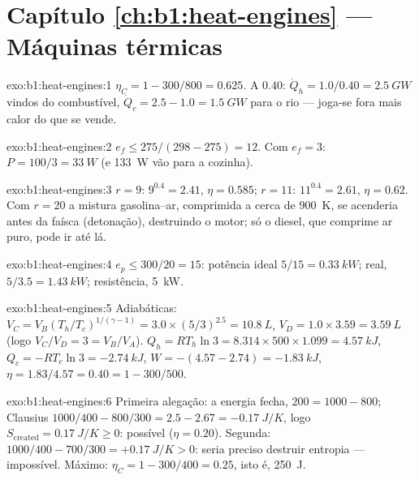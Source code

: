 \section*{Capítulo \ref{ch:b1:heat-engines} --- Máquinas térmicas}

\begin{solution}{exo:b1:heat-engines:1}
$\eta_C = 1 - 300/800 = 0.625$. A $0.40$: $\dot Q_h = 1.0/0.40 = \qty{2.5}{GW}$
vindos do combustível, $\dot Q_c = 2.5 - 1.0 = \qty{1.5}{GW}$ para o rio --- joga-se
fora mais calor do que se vende.
\end{solution}

\begin{solution}{exo:b1:heat-engines:2}
$e_f \leq 275/(298 - 275) = 12$. Com $e_f = 3$: $P = 100/3 = \qty{33}{W}$
(e \qty{133}{W} vão para a cozinha).
\end{solution}

\begin{solution}{exo:b1:heat-engines:3}
$r = 9$: $9^{0.4} = 2.41$, $\eta = 0.585$; $r = 11$: $11^{0.4} = 2.61$,
$\eta = 0.62$. Com $r = 20$ a mistura gasolina--ar, comprimida a cerca de
\qty{900}{K}, se acenderia antes da faísca (detonação), destruindo o
motor; só o diesel, que comprime ar puro, pode ir até lá.
\end{solution}

\begin{solution}{exo:b1:heat-engines:4}
$e_p \leq 300/20 = 15$: potência ideal $5/15 = \qty{0.33}{kW}$; real, $5/3.5 =
\qty{1.43}{kW}$; resistência, \qty{5}{kW}.
\end{solution}

\begin{solution}{exo:b1:heat-engines:5}
Adiabáticas: $V_C = V_B(T_h/T_c)^{1/(\gamma-1)} = 3.0 \times (5/3)^{2.5} =
\qty{10.8}{L}$, $V_D = 1.0 \times 3.59 = \qty{3.59}{L}$ (logo $V_C/V_D = 3 =
V_B/V_A$). $Q_h = RT_h\ln3 = 8.314 \times 500 \times 1.099 = \qty{4.57}{kJ}$,
$Q_c = -RT_c\ln3 = \qty{-2.74}{kJ}$, $W = -(4.57 - 2.74) = \qty{-1.83}{kJ}$,
$\eta = 1.83/4.57 = 0.40 = 1 - 300/500$.
\end{solution}

\begin{solution}{exo:b1:heat-engines:6}
Primeira alegação: a energia fecha, $200 = 1000 - 800$; Clausius $1000/400 - 800/300
= 2.5 - 2.67 = \qty{-0.17}{J/K}$, logo $S_{\mathrm{created}} = \qty{0.17}{J/K} \geq 0$:
possível ($\eta = 0.20$). Segunda: $1000/400 - 700/300 = +\qty{0.17}{J/K} > 0$:
seria preciso destruir entropia --- impossível. Máximo: $\eta_C = 1 -
300/400 = 0.25$, isto é, \qty{250}{J}.
\end{solution}

